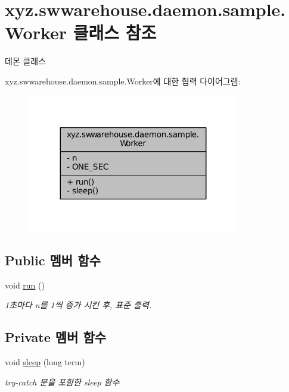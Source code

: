 \hypertarget{classxyz_1_1swwarehouse_1_1daemon_1_1sample_1_1_worker}{\section{xyz.\+swwarehouse.\+daemon.\+sample.\+Worker 클래스 참조}
\label{classxyz_1_1swwarehouse_1_1daemon_1_1sample_1_1_worker}
}


데몬 클래스  




xyz.\+swwarehouse.\+daemon.\+sample.\+Worker에 대한 협력 다이어그램\+:\nopagebreak
\begin{figure}[H]
\begin{center}
\leavevmode
\includegraphics[width=263pt]{classxyz_1_1swwarehouse_1_1daemon_1_1sample_1_1_worker__coll__graph}
\end{center}
\end{figure}
\subsection*{Public 멤버 함수}
\begin{DoxyCompactItemize}
\item 
void \hyperlink{classxyz_1_1swwarehouse_1_1daemon_1_1sample_1_1_worker_af1bf199e3277a2946e59c7acc5416731}{run} ()
\begin{DoxyCompactList}\small\item\em 1초마다 n를 1씩 증가 시킨 후, 표준 출력. \end{DoxyCompactList}\end{DoxyCompactItemize}
\subsection*{Private 멤버 함수}
\begin{DoxyCompactItemize}
\item 
void \hyperlink{classxyz_1_1swwarehouse_1_1daemon_1_1sample_1_1_worker_ae9991783aa9ada529a18ecb5abdb4ad7}{sleep} (long term)
\begin{DoxyCompactList}\small\item\em try-\/catch 문을 포함한 sleep 함수 \end{DoxyCompactList}\end{DoxyCompactItemize}
